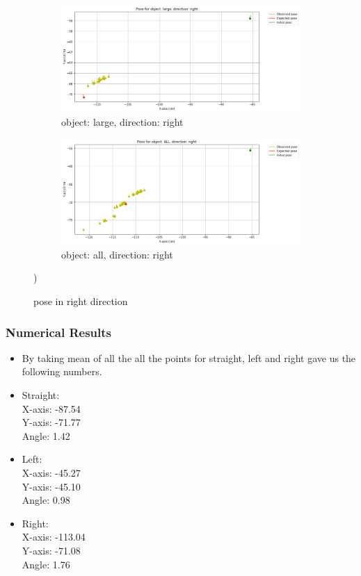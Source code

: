 \documentclass[10pt,a4paper]{article}
\begin{document}
\begin{itemize}
\begin{figure}[H]
									\begin{subfigure}{0.5\textwidth}
										\centering
										\includegraphics[width=0.8\linewidth]{img/pose_large_right.png}
										\caption{object: large, direction: right}
										\label{fig:object: large, direction: right}
									\end{subfigure}%
									\begin{subfigure}{0.5\textwidth}
										\centering
										\includegraphics[width=0.8\linewidth]{img/pose_all_right.png}
										\caption{object: all, direction: right}
										\label{fig:object: all, direction: right}
									\end{subfigure}
									\right) 
									\caption{pose in right direction}
									\label{fig:pose in right direction}
								\end{figure}

							\end{itemize}	
					\subsubsection{Numerical Results}
							\begin{itemize}
							\item By taking mean of all the all the points for straight, left and right gave us the following numbers. 
							\item Straight: \\
									X-axis: -87.54 \\
									Y-axis: -71.77 \\
									Angle: 1.42	
							\item Left:\\
									X-axis: -45.27\\
									Y-axis: -45.10 \\
									Angle: 0.98
							\item Right:\\
									X-axis: -113.04\\
									Y-axis: -71.08 \\
									Angle: 1.76

							\end{itemize}		
					
\end{document}
